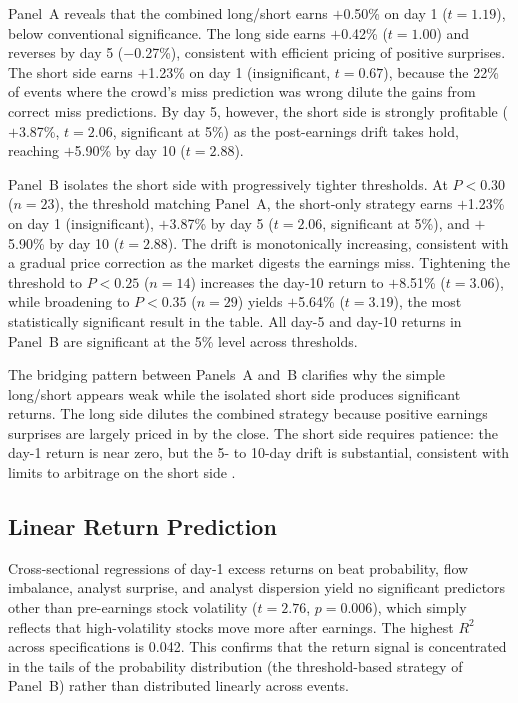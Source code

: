 \documentclass[11pt]{article}
\begin{document}
Panel~A reveals that the combined long/short earns $+$0.50\% on day 1 ($t = 1.19$), below conventional significance. The long side earns $+$0.42\% ($t = 1.00$) and reverses by day 5 ($-$0.27\%), consistent with efficient pricing of positive surprises. The short side earns $+$1.23\% on day 1 (insignificant, $t = 0.67$), because the 22\% of events where the crowd's miss prediction was wrong dilute the gains from correct miss predictions. By day 5, however, the short side is strongly profitable ($+$3.87\%, $t = 2.06$, significant at 5\%) as the post-earnings drift takes hold, reaching $+$5.90\% by day 10 ($t = 2.88$).

Panel~B isolates the short side with progressively tighter thresholds. At $P < 0.30$ ($n = 23$), the threshold matching Panel~A, the short-only strategy earns $+$1.23\% on day 1 (insignificant), $+$3.87\% by day 5 ($t = 2.06$, significant at 5\%), and $+$5.90\% by day 10 ($t = 2.88$). The drift is monotonically increasing, consistent with a gradual price correction as the market digests the earnings miss. Tightening the threshold to $P < 0.25$ ($n = 14$) increases the day-10 return to $+$8.51\% ($t = 3.06$), while broadening to $P < 0.35$ ($n = 29$) yields $+$5.64\% ($t = 3.19$), the most statistically significant result in the table. All day-5 and day-10 returns in Panel~B are significant at the 5\% level across thresholds.

The bridging pattern between Panels~A and~B clarifies why the simple long/short appears weak while the isolated short side produces significant returns. The long side dilutes the combined strategy because positive earnings surprises are largely priced in by the close. The short side requires patience: the day-1 return is near zero, but the 5- to 10-day drift is substantial, consistent with limits to arbitrage on the short side \citep{shleifer1997limits}.

\subsection{Linear Return Prediction}

Cross-sectional regressions of day-1 excess returns on beat probability, flow imbalance, analyst surprise, and analyst dispersion yield no significant predictors other than pre-earnings stock volatility ($t = 2.76$, $p = 0.006$), which simply reflects that high-volatility stocks move more after earnings. The highest $R^2$ across specifications is 0.042. This confirms that the return signal is concentrated in the tails of the probability distribution (the threshold-based strategy of Panel~B) rather than distributed linearly across events.
\end{document}
